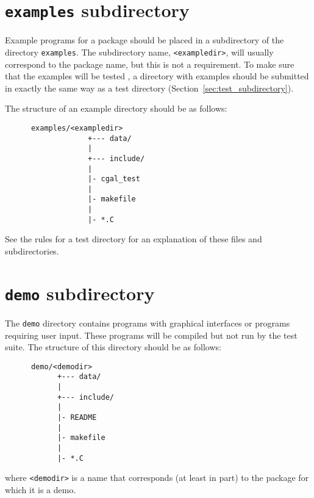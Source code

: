\section{{\tt examples} subdirectory}
\label{sec:examples_subdirectory}

Example programs for a package should be placed in a subdirectory of the 
directory {\tt examples}. 
The subdirectory name, \verb|<exampledir>|, will usually correspond to the 
package name, but this is not a requirement.
To make sure that the examples will be tested%
, 
a directory with examples 
should be submitted in exactly the same way as a test directory 
(Section~\ref{sec:test_subdirectory}). 

The structure of an example directory should be as follows: 
\begin{verbatim}
      examples/<exampledir>
                   +--- data/
                   |
                   +--- include/
                   |
                   |- cgal_test
                   |
                   |- makefile
                   |
                   |- *.C
\end{verbatim}

See the rules for a test directory for an explanation of these files 
and subdirectories. 

\section{{\tt demo} subdirectory}
\label{sec:demo_subdirectory}

The {\tt demo} directory contains programs with graphical interfaces or 
programs requiring user input. These programs will be compiled but not
run by the test suite.
The structure of this directory should be as follows: 
\begin{verbatim}
      demo/<demodir>
            +--- data/
            |
            +--- include/
            |
            |- README
            |
            |- makefile
            |
            |- *.C
\end{verbatim}
where \verb|<demodir>| is a name that corresponds (at least in part) to
the package for which it is a demo.

